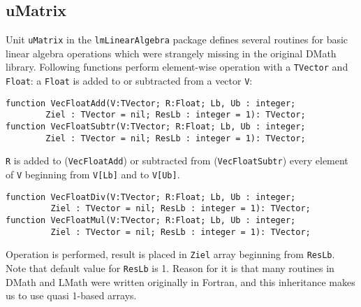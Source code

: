 \documentclass[12pt,a4paper,oneside]{article}
\newcommand{\code}[1]{\texttt{#1}}
\begin{document}
\subsection{uMatrix}
Unit \code{uMatrix} in the \code{lmLinearAlgebra} package defines several routines for basic linear algebra operations which were strangely missing in the original DMath library.
Following functions perform element-wise operation with a \code{TVector} and \code{Float}: a \code{Float} is added to or subtracted from a vector \code{V}:\vspace{-6pt}   
\begin{verbatim}
function VecFloatAdd(V:TVector; R:Float; Lb, Ub : integer; 
        Ziel : TVector = nil; ResLb : integer = 1): TVector;
function VecFloatSubtr(V:TVector; R:Float; Lb, Ub : integer; 
        Ziel : TVector = nil; ResLb : integer = 1): TVector;
\end{verbatim}\vspace{-6pt}
\code{R} is added to (\code{VecFloatAdd}) or subtracted from (\code{VecFloatSubtr}) every element of \code{V} beginning from \code{V[Lb]} and to \code{V[Ub]}. 
\begin{verbatim}
function VecFloatDiv(V:TVector; R:Float; Lb, Ub : integer; 
         Ziel : TVector = nil; ResLb : integer = 1): TVector;
function VecFloatMul(V:TVector; R:Float; Lb, Ub : integer;  
         Ziel : TVector = nil; ResLb : integer = 1): TVector;
\end{verbatim}\vspace{-6pt}
Operation is performed, result is placed in \code{Ziel} array beginning from \code{ResLb}. Note that default value for \code{ResLb} is 1. Reason for it is that many routines in DMath and LMath were written originally in Fortran, and this inheritance makes us to use quasi 1-based arrays.
\end{document}

